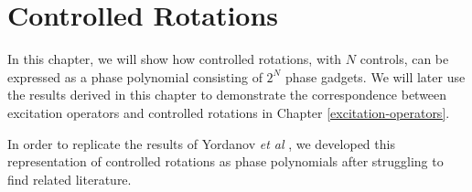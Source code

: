 \chapter{Controlled Rotations}%
\label{controlled-rotations}

In this chapter, we will show how controlled rotations, with $N$ controls, can be expressed as a phase polynomial consisting of $2^N$ phase gadgets. We will later use the results derived in this chapter to demonstrate the correspondence between excitation operators and controlled rotations in Chapter \ref{excitation-operators}.

In order to replicate the results of Yordanov \textit{et al} \cite{Yordanov2020}, we developed this representation of controlled rotations as phase polynomials after struggling to find related literature.
